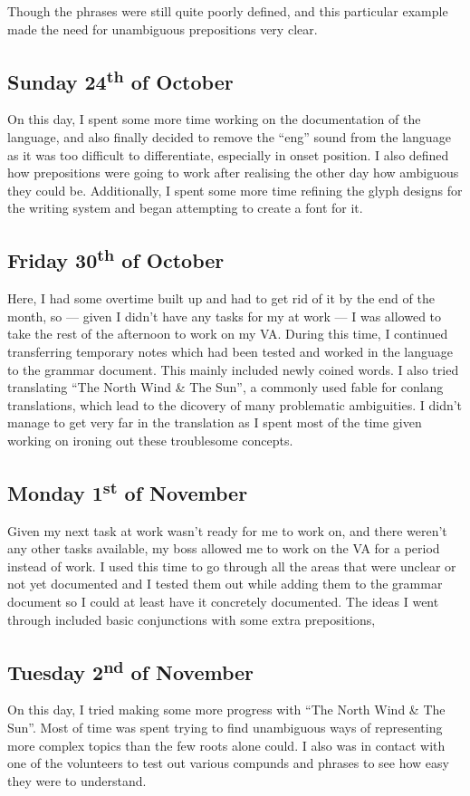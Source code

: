 \documentclass[a4paper,10pt]{article}
\begin{document}
Though the phrases were still quite poorly defined, and this particular example made the
need for unambiguous prepositions very clear.

\subsection{Sunday 24\textsuperscript{th} of October}
On this day, I spent some more time working on the documentation of the language, and
also finally decided to remove the ``eng'' sound from the language as it was too difficult
to differentiate, especially in onset position. I also defined how prepositions were going
to work after realising the other day how ambiguous they could be. Additionally, I spent
some more time refining the glyph designs for the writing system and began attempting to
create a font for it.

\subsection{Friday 30\textsuperscript{th} of October}
Here, I had some overtime built up and had to get rid of it by the end of the month, so ---
given I didn't have any tasks for my at work --- I was allowed to take the rest of the
afternoon to work on my VA. During this time, I continued transferring temporary notes which
had been tested and worked in the language to the grammar document. This mainly included
newly coined words. I also tried translating ``The North Wind \& The Sun'', a commonly used
fable for conlang translations, which lead to the dicovery of many problematic ambiguities.
I didn't manage to get very far in the translation as I spent most of the time given working
on ironing out these troublesome concepts.

\subsection{Monday 1\textsuperscript{st} of November}
Given my next task at work wasn't ready for me to work on, and there weren't any other tasks
available, my boss allowed me to work on the VA for a period instead of work. I used this
time to go through all the areas that were unclear or not yet documented and I tested them
out while adding them to the grammar document so I could at least have it concretely
documented. The ideas I went through included basic conjunctions with some extra prepositions,

\subsection{Tuesday 2\textsuperscript{nd} of November}
On this day, I tried making some more progress with ``The North Wind \& The Sun''. Most of time
was spent trying to find unambiguous ways of representing more complex topics than the few roots
alone could. I also was in contact with one of the volunteers to test out various compunds and
phrases to see how easy they were to understand.
\end{document}
